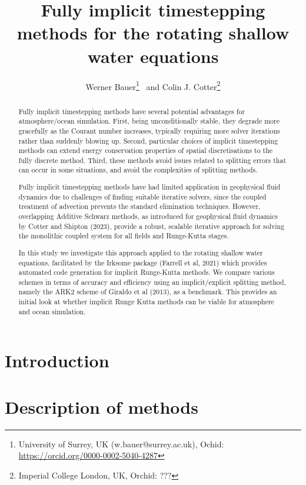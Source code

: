 \documentclass[a4paper, 12pt]{article}
\title{Fully implicit timestepping methods for the rotating shallow water equations}
\author{Werner Bauer\footnote{University of Surrey, UK (w.bauer@surrey.ac.uk), Ochid: \url{https://orcid.org/0000-0002-5040-4287}} \ and
Colin J. Cotter\footnote{Imperial College London, UK, Orchid: ???}  }
\begin{document}
\maketitle

\begin{abstract}
Fully implicit timestepping methods have several potential advantages for atmosphere/ocean simulation. First, being unconditionally stable, they degrade more gracefully as the Courant number increases, typically requiring more solver iterations rather than suddenly blowing up. Second, particular choices of implicit timestepping methods can extend energy conservation properties of spatial discretisations to the fully discrete method. Third, these methods avoid issues related to splitting errors that can occur in some situations, and avoid the complexities of splitting methods.

Fully implicit timestepping methods have had limited application in geophysical fluid dynamics due to challenges of finding suitable iterative solvers, since the coupled treatment of advection prevents the standard elimination techniques. However, overlapping Additive Schwarz methods, as introduced for geophysical fluid dynamics by Cotter and Shipton (2023), provide a robust, scalable iterative approach for solving the monolithic coupled system for all fields and Runge-Kutta stages.

In this study we investigate this approach applied to the rotating shallow water equations, facilitated by the Irksome package (Farrell et al, 2021) which provides automated code generation for implicit Runge-Kutta methods. We compare various schemes in terms of accuracy and efficiency using an implicit/explicit splitting method, namely the ARK2 scheme of Giraldo et al (2013), as a benchmark. This provides an initial look at whether implicit Runge Kutta methods can be viable for atmosphere and ocean simulation.
\end{abstract}

\section{Introduction}


\section{Description of methods}
\end{document}
